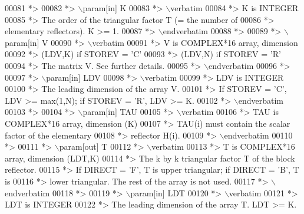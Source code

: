 \begin{DoxyCode}
00081 \textcolor{comment}{*>}
00082 \textcolor{comment}{*> \(\backslash\)param[in] K}
00083 \textcolor{comment}{*> \(\backslash\)verbatim}
00084 \textcolor{comment}{*>          K is INTEGER}
00085 \textcolor{comment}{*>          The order of the triangular factor T (= the number of}
00086 \textcolor{comment}{*>          elementary reflectors). K >= 1.}
00087 \textcolor{comment}{*> \(\backslash\)endverbatim}
00088 \textcolor{comment}{*>}
00089 \textcolor{comment}{*> \(\backslash\)param[in] V}
00090 \textcolor{comment}{*> \(\backslash\)verbatim}
00091 \textcolor{comment}{*>          V is COMPLEX*16 array, dimension}
00092 \textcolor{comment}{*>                               (LDV,K) if STOREV = 'C'}
00093 \textcolor{comment}{*>                               (LDV,N) if STOREV = 'R'}
00094 \textcolor{comment}{*>          The matrix V. See further details.}
00095 \textcolor{comment}{*> \(\backslash\)endverbatim}
00096 \textcolor{comment}{*>}
00097 \textcolor{comment}{*> \(\backslash\)param[in] LDV}
00098 \textcolor{comment}{*> \(\backslash\)verbatim}
00099 \textcolor{comment}{*>          LDV is INTEGER}
00100 \textcolor{comment}{*>          The leading dimension of the array V.}
00101 \textcolor{comment}{*>          If STOREV = 'C', LDV >= max(1,N); if STOREV = 'R', LDV >= K.}
00102 \textcolor{comment}{*> \(\backslash\)endverbatim}
00103 \textcolor{comment}{*>}
00104 \textcolor{comment}{*> \(\backslash\)param[in] TAU}
00105 \textcolor{comment}{*> \(\backslash\)verbatim}
00106 \textcolor{comment}{*>          TAU is COMPLEX*16 array, dimension (K)}
00107 \textcolor{comment}{*>          TAU(i) must contain the scalar factor of the elementary}
00108 \textcolor{comment}{*>          reflector H(i).}
00109 \textcolor{comment}{*> \(\backslash\)endverbatim}
00110 \textcolor{comment}{*>}
00111 \textcolor{comment}{*> \(\backslash\)param[out] T}
00112 \textcolor{comment}{*> \(\backslash\)verbatim}
00113 \textcolor{comment}{*>          T is COMPLEX*16 array, dimension (LDT,K)}
00114 \textcolor{comment}{*>          The k by k triangular factor T of the block reflector.}
00115 \textcolor{comment}{*>          If DIRECT = 'F', T is upper triangular; if DIRECT = 'B', T is}
00116 \textcolor{comment}{*>          lower triangular. The rest of the array is not used.}
00117 \textcolor{comment}{*> \(\backslash\)endverbatim}
00118 \textcolor{comment}{*>}
00119 \textcolor{comment}{*> \(\backslash\)param[in] LDT}
00120 \textcolor{comment}{*> \(\backslash\)verbatim}
00121 \textcolor{comment}{*>          LDT is INTEGER}
00122 \textcolor{comment}{*>          The leading dimension of the array T. LDT >= K.}

\end{DoxyCode}
